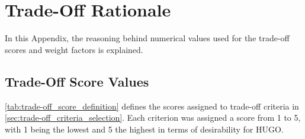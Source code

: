 \chapter{Trade-Off Rationale}
\label{ch:app_trade-off_rationale}
In this Appendix, the reasoning behind numerical values used for the trade-off scores and weight factors is explained.

\section{Trade-Off Score Values}
\autoref{tab:trade-off_score_definition} defines the scores assigned to trade-off criteria in \autoref{sec:trade-off_criteria_selection}. Each criterion was assigned a score from 1 to 5, with 1 being the lowest and 5 the highest in terms of desirability for HUGO.


